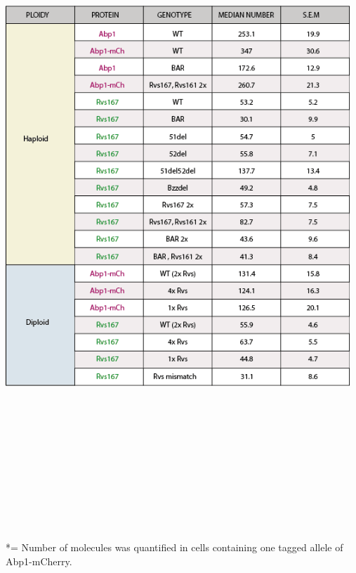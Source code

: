 \newpage
\begin{table}[H]
	\centering
	\includegraphics[width=13cm,height=25cm,keepaspectratio]{figures/results_final/table_numbers}
		\caption[Median molecule number of Rvs167 and Abp1]
	{ *= Number of molecules was quantified in cells containing one tagged allele of Abp1-mCherry. 
	\label{table1_numbers}}
\end{table}

